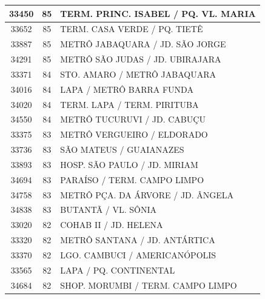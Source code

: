 \documentclass[
	12pt,				%
	oneside,			%
	a4paper,			%
	english,			%
	brazil				%
	]{abntex2ppgsi}
\begin{document}
{{\begin{apendicesenv}
\begin{longtable}{c|c|p{7cm}}
    33450 & 85    & TERM. PRINC. ISABEL / PQ. VL. MARIA \\
\hline

    33652 & 85    & TERM. CASA VERDE / PQ. TIETÊ \\
\hline

    33887 & 85    & METRÔ JABAQUARA / JD. SÃO JORGE \\
\hline

    34291 & 85    & METRÔ SÃO JUDAS / JD. UBIRAJARA \\
\hline

    33371 & 84    & STO. AMARO / METRÔ JABAQUARA \\
\hline

    34016 & 84    & LAPA / METRÔ BARRA FUNDA \\
\hline

    34020 & 84    & TERM. LAPA / TERM. PIRITUBA \\
\hline

    34550 & 84    & METRÔ TUCURUVI / JD. CABUÇU \\
\hline

    33375 & 83    & METRÔ VERGUEIRO / ELDORADO \\
\hline

    33736 & 83    & SÃO MATEUS / GUAIANAZES \\
\hline

    33893 & 83    & HOSP. SÃO PAULO / JD. MIRIAM \\
\hline

    34694 & 83    & PARAÍSO / TERM. CAMPO LIMPO \\
\hline

    34758 & 83    & METRÔ PÇA. DA ÁRVORE / JD. ÂNGELA \\
\hline

    34838 & 83    & BUTANTÃ / VL. SÔNIA \\
\hline

    33020 & 82    & COHAB II / JD. HELENA \\
\hline

    33320 & 82    & METRÔ SANTANA / JD. ANTÁRTICA \\
\hline

    33370 & 82    & LGO. CAMBUCI / AMERICANÓPOLIS \\
\hline

    33565 & 82    & LAPA / PQ. CONTINENTAL \\
\hline

    34684 & 82    & SHOP. MORUMBI / TERM. CAMPO LIMPO \\
\hline


\end{longtable}
\end{apendicesenv}}}
\end{document}
